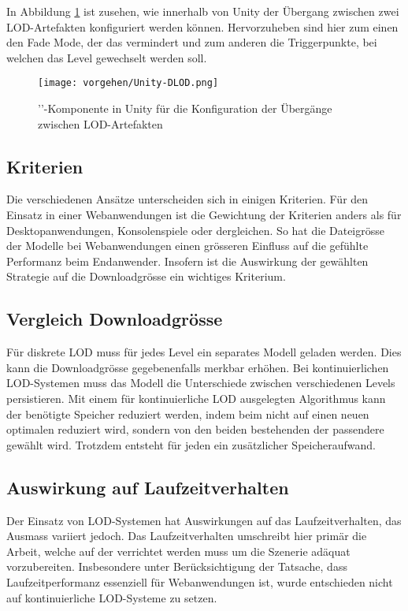 In Abbildung \ref{fig:unityDLODGroup} ist zusehen, wie innerhalb von Unity der Übergang zwischen zwei LOD-Artefakten konfiguriert werden können. Hervorzuheben sind hier zum einen den Fade Mode, der das  vermindert und zum anderen die Triggerpunkte, bei welchen das Level gewechselt werden soll.

\begin{figure}[H]
  \centering
  \texttt{[image: vorgehen/Unity-DLOD.png]}
  \caption{''-Komponente in Unity für die Konfiguration der Übergänge zwischen LOD-Artefakten}
  \label{fig:unityDLODGroup}
\end{figure}

\subsection{Kriterien}

Die verschiedenen Ansätze unterscheiden sich in einigen Kriterien. Für den Einsatz in einer Webanwendungen ist die Gewichtung der Kriterien anders als für Desktopanwendungen, Konsolenspiele oder dergleichen.
So hat die Dateigrösse der Modelle bei Webanwendungen einen grösseren Einfluss auf die gefühlte Performanz beim Endanwender. Insofern ist die Auswirkung der gewählten Strategie auf die Downloadgrösse ein wichtiges Kriterium.

\subsection{Vergleich Downloadgrösse}

Für diskrete LOD muss für jedes Level ein separates Modell geladen werden. Dies kann die Downloadgrösse gegebenenfalls merkbar erhöhen. Bei kontinuierlichen LOD-Systemen muss das Modell die Unterschiede zwischen verschiedenen Levels persistieren. Mit einem für kontinuierliche LOD ausgelegten Algorithmus kann der benötigte Speicher reduziert werden, indem beim  nicht auf einen neuen optimalen  reduziert wird, sondern von den beiden bestehenden  der passendere gewählt wird. Trotzdem entsteht für jeden  ein zusätzlicher Speicheraufwand.

\subsection{Auswirkung auf Laufzeitverhalten}

Der Einsatz von LOD-Systemen hat Auswirkungen auf das Laufzeitverhalten, das Ausmass variiert jedoch. Das Laufzeitverhalten umschreibt hier primär die Arbeit, welche auf der  verrichtet werden muss um die Szenerie adäquat vorzubereiten.
Insbesondere unter Berücksichtigung der Tatsache, dass Laufzeitperformanz essenziell für Webanwendungen ist, wurde entschieden nicht auf kontinuierliche LOD-Systeme zu setzen.


